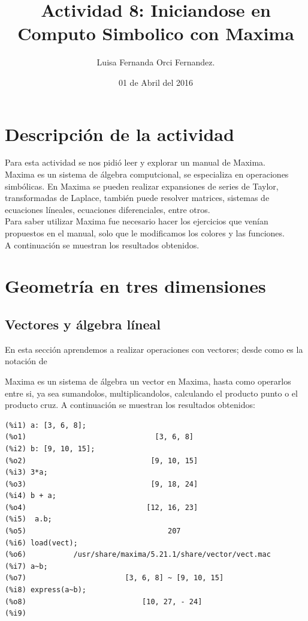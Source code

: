 \documentclass[12pt,letterpaper]{article}
\begin{document}
\title{Actividad 8: Iniciandose en Computo Simbolico con Maxima}
\author{Luisa Fernanda Orci Fernandez.}
\date{01 de Abril del 2016}

\maketitle


\section*{Descripción de la actividad}

Para esta actividad se nos pidió leer y explorar un manual de Maxima. \\
 
Maxima es un sistema de álgebra computcional, se especializa en operaciones simbólicas. \cite{1} En Maxima se pueden realizar expansiones de series de Taylor, transformadas de Laplace, también puede resolver matrices, sistemas de ecuaciones líneales, ecuaciones diferenciales, entre otros. \\
Para saber utilizar Maxima fue necesario hacer los ejercicios que venían propuestos en el manual, solo que le modificamos los colores y las funciones. \\

A continuación se muestran los resultados obtenidos.

\section{Geometría en tres dimensiones}

\subsection{Vectores y álgebra líneal}
En esta sección aprendemos a realizar operaciones con vectores; desde como es la notación de
 
Maxima es un sistema de álgebra un vector en Maxima, hasta como operarlos entre si, ya sea sumandolos, multiplicandolos, calculando el producto punto o el producto cruz. A continuación se muestran los resultados obtenidos:

\begin{verbatim}
(%i1) a: [3, 6, 8];
(%o1)                              [3, 6, 8]
(%i2) b: [9, 10, 15];
(%o2)                             [9, 10, 15]
(%i3) 3*a;
(%o3)                             [9, 18, 24]
(%i4) b + a;
(%o4)                            [12, 16, 23]
(%i5)  a.b;
(%o5)                                 207
(%i6) load(vect);
(%o6)           /usr/share/maxima/5.21.1/share/vector/vect.mac
(%i7) a~b;
(%o7)                       [3, 6, 8] ~ [9, 10, 15]
(%i8) express(a~b);
(%o8)                           [10, 27, - 24]
(%i9) 
\end{verbatim}
\end{document}
